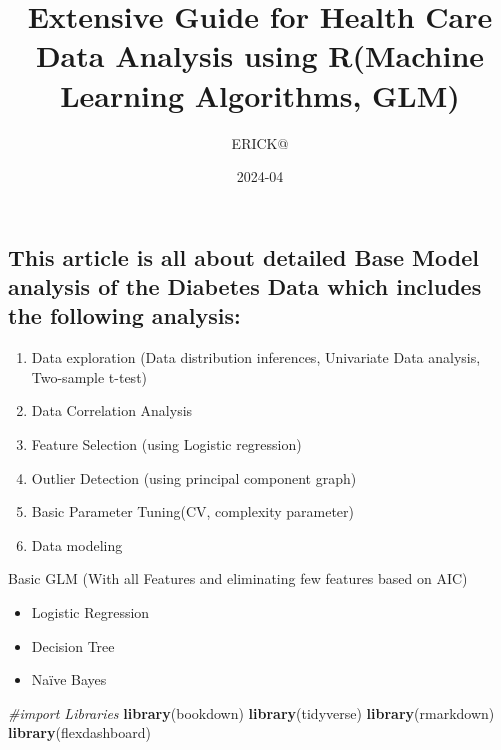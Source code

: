 \documentclass[
]{article}
\title{Extensive Guide for Health Care Data Analysis using R(Machine
Learning Algorithms, GLM)}
\author{ERICK@}
\date{2024-04}
\newenvironment{Shaded}{\begin{snugshade}}{\end{snugshade}}
\newcommand{\CommentTok}[1]{\textcolor[rgb]{0.56,0.35,0.01}{\textit{#1}}}
\newcommand{\FunctionTok}[1]{\textcolor[rgb]{0.13,0.29,0.53}{\textbf{#1}}}
\newcommand{\NormalTok}[1]{#1}
\begin{document}
\maketitle

\hypertarget{this-article-is-all-about-detailed-base-model-analysis-of-the-diabetes-data-which-includes-the-following-analysis}{%
\subsection{\texorpdfstring{\textbf{This article is all about detailed
Base Model analysis of the Diabetes Data which includes the following
analysis:}}{This article is all about detailed Base Model analysis of the Diabetes Data which includes the following analysis:}}\label{this-article-is-all-about-detailed-base-model-analysis-of-the-diabetes-data-which-includes-the-following-analysis}}

\begin{enumerate}
\def\labelenumi{\arabic{enumi}.}
\item
  Data exploration (Data distribution inferences, Univariate Data
  analysis, Two-sample t-test)
\item
  Data Correlation Analysis
\item
  Feature Selection (using Logistic regression)
\item
  Outlier Detection (using principal component graph)
\item
  Basic Parameter Tuning(CV, complexity parameter)
\item
  Data modeling
\end{enumerate}

Basic GLM (With all Features and eliminating few features based on AIC)

\begin{itemize}
\item
  Logistic Regression
\item
  Decision Tree
\item
  Naïve Bayes
\end{itemize}

\begin{Shaded}
\begin{Highlighting}[]
\CommentTok{\#import Libraries}
\FunctionTok{library}\NormalTok{(bookdown)}
\FunctionTok{library}\NormalTok{(tidyverse)}
\FunctionTok{library}\NormalTok{(rmarkdown)}
\FunctionTok{library}\NormalTok{(flexdashboard)}
\end{Highlighting}
\end{Shaded}
\end{document}

